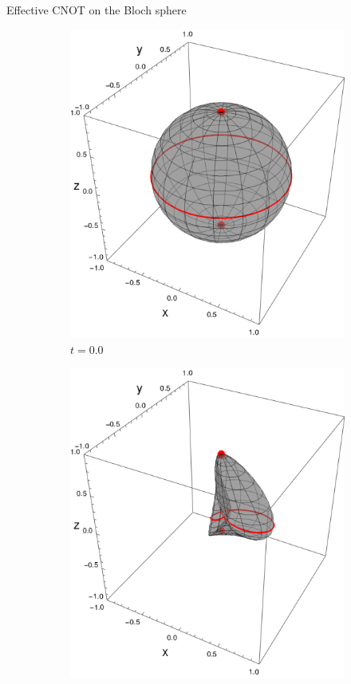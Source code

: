 \begin{frame}{Effective CNOT on the Bloch sphere}
    \begin{figure}[h!]
        \centering
        \begin{subfigure}{0.32\textwidth}
            \centering
            \includegraphics[width=0.9\linewidth]{figures/sphere_CNOT_t=0.0_z=0.8_p=0.6.png}
            \caption{$t=0.0$}
        \end{subfigure}%
        \begin{subfigure}{0.32\textwidth}
            \centering
            \includegraphics[width=0.9\linewidth]{figures/sphere_CNOT_t=1.0_z=0.8_p=0.6.png}

\end{subfigure}
\end{figure}
\end{frame}
